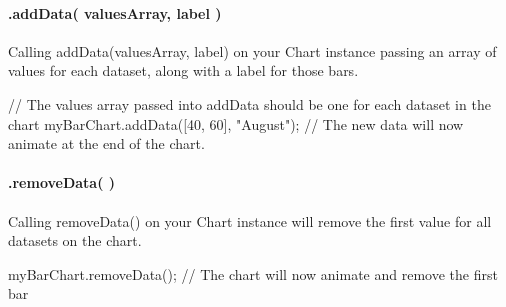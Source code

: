 \paragraph*{.add\+Data( values\+Array, label )}

Calling {\ttfamily add\+Data(values\+Array, label)} on your Chart instance passing an array of values for each dataset, along with a label for those bars.


\begin{DoxyCode}
// The values array passed into addData should be one for each dataset in the chart
myBarChart.addData([40, 60], "August");
// The new data will now animate at the end of the chart.
\end{DoxyCode}


\paragraph*{.remove\+Data( )}

Calling {\ttfamily remove\+Data()} on your Chart instance will remove the first value for all datasets on the chart.


\begin{DoxyCode}
myBarChart.removeData();
// The chart will now animate and remove the first bar
\end{DoxyCode}
 